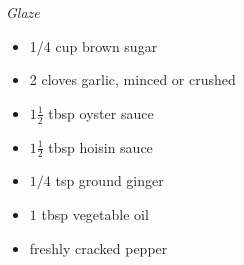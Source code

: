 \documentclass{article}
\newcommand{\ingredients}[1][\Large\emph{Ingredients}]{%
    \emph{#1}\\}
\begin{document}
\begin{minipage}{\textwidth}
\begin{multicols*}{2}
\columnbreak
\begin{minipage}{\linewidth}
\ingredients[Glaze]
\begin{itemize}
    \item 1/4 cup brown sugar
    \item 2 cloves garlic, minced or crushed
    \item $1 \frac{1}{2}$ tbsp oyster sauce
    \item $1 \frac{1}{2}$ tbsp hoisin sauce
    \item $1/4$ tsp ground ginger
    \item $1$ tbsp vegetable oil
    \item freshly cracked pepper
\end{itemize}
\end{minipage}
\end{multicols*}
\end{minipage}
\vspace{1em}
\end{document}
